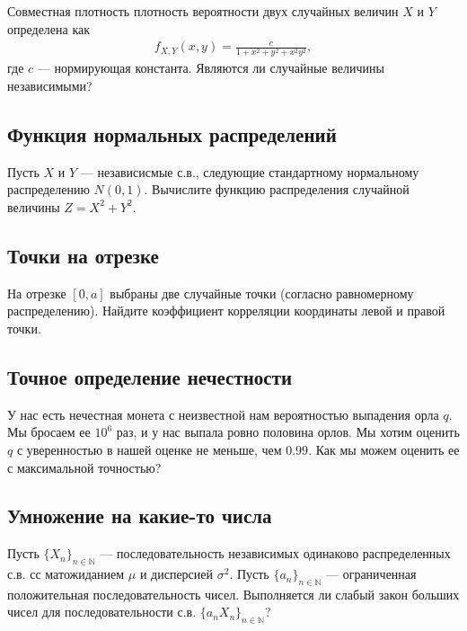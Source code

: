 \documentclass[12pt]{article}
\newcommand\N{\mathbb{N}}
\begin{document}
Совместная плотность плотность вероятности двух случайных величин $X$ и $Y$ определена как
\begin{align*}
    f_{X, Y}(x, y) = \frac{c}{1 + x^2 + y^2 + x^2y^2},
\end{align*}
где $c$ --- нормирующая константа. Являются ли случайные величины независимыми?



\subsection{Функция нормальных распределений}

Пусть $X$ и $Y$ --- независисмые с.в., следующие стандартному нормальному распределению $N(0, 1)$. Вычислите функцию распределения случайной величины $Z = X^2 + Y^2$.



\subsection{Точки на отрезке}

На отрезке $[0, a]$ выбраны две случайные точки (согласно равномерному распределению). Найдите коэффициент корреляции координаты левой и правой точки. 



\subsection{Точное определение нечестности}

У нас есть нечестная монета с неизвестной нам вероятностью выпадения орла $q$. Мы бросаем ее $10^6$ раз, и у нас выпала ровно половина орлов. Мы хотим оценить $q$ с уверенностью в нашей оценке не меньше, чем $0.99$. Как мы можем оценить ее с максимальной точностью? 



\subsection{Умножение на какие-то числа}

Пусть $\{X_n\}_{n \in \N}$ --- последовательность независимых одинаково распределенных с.в. сс матожиданием $\mu$ и дисперсией $\sigma^2$. Пусть $\{a_n\}_{n \in \N}$ --- ограниченная положительная последовательность чисел. Выполняется ли слабый закон больших чисел для последовательности с.в. $\{a_n X_n\}_{n \in \N}$?
\end{document}
